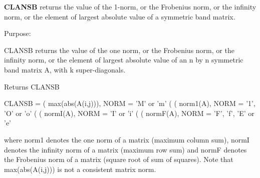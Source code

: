 {\bfseries C\+L\+A\+N\+S\+B} returns the value of the 1-\/norm, or the Frobenius norm, or the infinity norm, or the element of largest absolute value of a symmetric band matrix. 

 \begin{DoxyParagraph}{Purpose\+: }
\begin{DoxyVerb} CLANSB  returns the value of the one norm,  or the Frobenius norm, or
 the  infinity norm,  or the element of  largest absolute value  of an
 n by n symmetric band matrix A,  with k super-diagonals.\end{DoxyVerb}

\end{DoxyParagraph}
\begin{DoxyReturn}{Returns}
C\+L\+A\+N\+S\+B \begin{DoxyVerb}    CLANSB = ( max(abs(A(i,j))), NORM = 'M' or 'm'
             (
             ( norm1(A),         NORM = '1', 'O' or 'o'
             (
             ( normI(A),         NORM = 'I' or 'i'
             (
             ( normF(A),         NORM = 'F', 'f', 'E' or 'e'

 where  norm1  denotes the  one norm of a matrix (maximum column sum),
 normI  denotes the  infinity norm  of a matrix  (maximum row sum) and
 normF  denotes the  Frobenius norm of a matrix (square root of sum of
 squares).  Note that  max(abs(A(i,j)))  is not a consistent matrix norm.\end{DoxyVerb}
 
\end{DoxyReturn}


